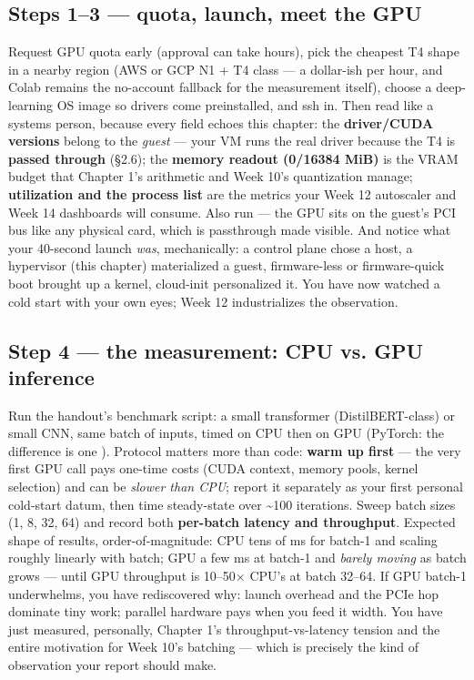 \subsection*{Steps 1–3 — quota, launch, meet the GPU}

Request GPU quota early (approval can take hours), pick the cheapest T4 shape in a nearby region (AWS  or GCP N1 + T4 class — a dollar-ish per hour, and Colab remains the no-account fallback for the measurement itself), choose a deep-learning OS image so drivers come preinstalled, and ssh in. Then read  like a systems person, because every field echoes this chapter: the \textbf{driver/CUDA versions} belong to the \textit{guest} — your VM runs the real driver because the T4 is \textbf{passed through} (§2.6); the \textbf{memory readout (0/16384 MiB)} is the VRAM budget that Chapter 1's arithmetic and Week 10's quantization manage; \textbf{utilization and the process list} are the metrics your Week 12 autoscaler and Week 14 dashboards will consume. Also run  — the GPU sits on the guest's PCI bus like any physical card, which is passthrough made visible. And notice what your 40-second launch \textit{was}, mechanically: a control plane chose a host, a hypervisor (this chapter) materialized a guest, firmware-less or firmware-quick boot brought up a kernel, cloud-init personalized it. You have now watched a cold start with your own eyes; Week 12 industrializes the observation.

\subsection*{Step 4 — the measurement: CPU vs. GPU inference}

Run the handout's benchmark script: a small transformer (DistilBERT-class) or small CNN, same batch of inputs, timed on CPU then on GPU (PyTorch: the difference is one ). Protocol matters more than code: \textbf{warm up first} — the very first GPU call pays one-time costs (CUDA context, memory pools, kernel selection) and can be \textit{slower than CPU}; report it separately as your first personal cold-start datum, then time steady-state over \textasciitilde{}100 iterations. Sweep batch sizes (1, 8, 32, 64) and record both \textbf{per-batch latency and throughput}. Expected shape of results, order-of-magnitude: CPU tens of ms for batch-1 and scaling roughly linearly with batch; GPU a few ms at batch-1 and \textit{barely moving} as batch grows — until GPU throughput is 10–50× CPU's at batch 32–64. If GPU batch-1 underwhelms, you have rediscovered why: launch overhead and the PCIe hop dominate tiny work; parallel hardware pays when you feed it width. You have just measured, personally, Chapter 1's throughput-vs-latency tension and the entire motivation for Week 10's batching — which is precisely the kind of observation your report should make.


